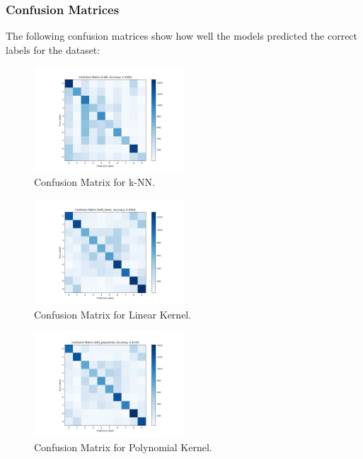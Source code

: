\documentclass[lettersize,journal]{IEEEtran}
\begin{document}
\subsubsection{\textbf{Confusion Matrices}}
The following confusion matrices show how well the models predicted the correct labels for the dataset:
\begin{figure}[H]
    \centering
    \includegraphics[width=0.5\textwidth]{grid_confusion_matrix_k-NN.png}
    \caption{Confusion Matrix for k-NN.}
    \label{fig:confusion-matrix-k-NN}
\end{figure}
\begin{figure}[H]
    \centering
    \includegraphics[width=0.5\textwidth]{grid_confusion_matrix_SVM_linear.png}
    \caption{Confusion Matrix for Linear Kernel.}
    \label{fig:confusion-matrix-linear}
\end{figure}
\begin{figure}[H]
    \centering
    \includegraphics[width=0.5\textwidth]{grid_confusion_matrix_SVM_polynomial.png}
    \caption{Confusion Matrix for Polynomial Kernel.}
    \label{fig:confusion-matrix-polynomial}
\end{figure}
\end{document}

